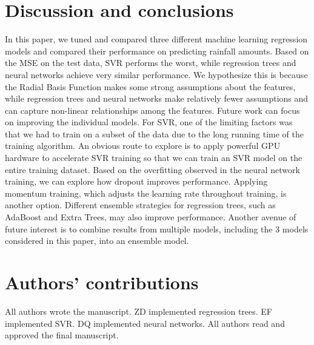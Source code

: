 \documentclass[12pt] {article}
\begin{document}
\section{Discussion and conclusions}
In this paper, we tuned and compared three different machine learning regression models and compared their performance on predicting rainfall amounts. Based on the MSE on the test data, SVR performs the worst, while regression trees and neural networks achieve very similar performance. We hypothesize this is because the Radial Basis Function makes some strong assumptions about the features, while regression trees and neural networks make relatively fewer assumptions and can capture non-linear relationships among the features. Future work can focus on improving the individual models. For SVR, one of the limiting factors was that we had to train on a subset of the data due to the long running time of the training algorithm. An obvious route to explore is to apply powerful GPU hardware to accelerate SVR training so that we can train an SVR model on the entire training dataset. Based on the overfitting observed in the neural network training, we can explore how dropout improves performance. Applying momentum training, which adjusts the learning rate throughout training, is another option. Different ensemble strategies for regression trees, such as AdaBoost and Extra Trees, may also improve performance. Another avenue of future interest is to combine results from multiple models, including the 3 models considered in this paper, into an ensemble model.

\section{Authors' contributions}
All authors wrote the manuscript. ZD implemented regression trees. EF implemented SVR. DQ implemented neural networks. All authors read and approved the final manuscript.
\end{document}
